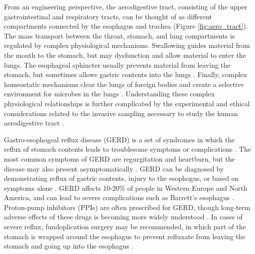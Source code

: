 \documentclass[12pt]{article}
\begin{document}
From an engineering perspective, the aerodigestive tract,
consisting of the upper gastrointestinal and respiratory tracts,
can be thought of as different compartments connected by the esophagus and trachea (Figure \ref{fig:aero_tract}).
The mass transport between the throat, stomach, and lung compartments is regulated by complex physiological 
mechanisms. Swallowing guides material from the mouth to the stomach, 
but may dysfunction and allow material to enter the lungs. The 
esophageal sphincter usually prevents material from leaving the 
stomach, but sometimes allows gastric contents into the lungs \cite{beck-lung-2012}. Finally, complex 
homeostatic mechanisms clear the lungs of foreign bodies and create a 
selective environment for microbes in the lungs \cite{martinharris-mbs-2008, dickson-lung_microbiome-2014}. 
Understanding these complex physiological relationships is further complicated
by the experimental and ethical considerations related to the 
invasive sampling necessary to study the human aerodigestive tract \cite{beck-lung-2012}.

Gastro-esophogeal reflux disease (GERD) is a set of syndromes in which 
the reflux of stomach contents leads to troublesome symptoms or 
complications \cite{vakil-gerd_defn-2006, dent-gerd_epi-2005}. The most common symptoms of GERD 
are regurgitation and heartburn, but the disease may also present 
asymptomatically \cite{vakil-gerd_defn-2006, dent-gerd_epi-2005}. 
GERD can be diagnosed by demonstrating reflux of gastric contents, injury to the esophogus, 
or based on symptoms alone \cite{vakil-gerd_defn-2006}. GERD affects
10-20\% of people in Western Europe and North America, and can lead to severe complications such as Barrett's 
esophagus \cite{vakil-gerd_defn-2006}. Proton-pump inhibitors (PPIs) are often prescribed for GERD,
though long-term adverse effects of these drugs is becoming more widely understood \cite{sweet-gerd_asp-2009, imhann-ppi-2016, houghton-microaspiration-2016}.
In cases of severe reflux, fundoplication surgery may
be recommended, in which part of the stomach is wrapped around the 
esophagus to prevent refluxate from leaving the stomach and going up
into the esophagus \cite{sweet-gerd_asp-2009}. 
\end{document}
